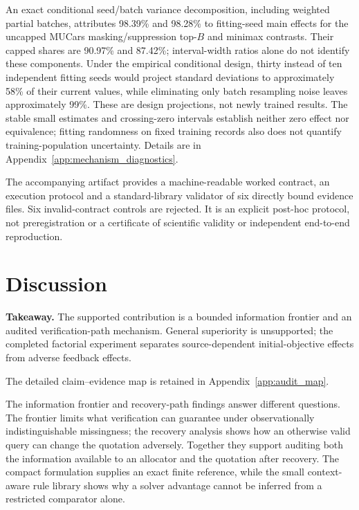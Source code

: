 \documentclass[11pt]{article}
\begin{document}
An exact conditional seed/batch variance decomposition, including weighted
partial batches, attributes 98.39\% and 98.28\% to fitting-seed main effects
for the uncapped MUCars masking/suppression top-$B$ and minimax contrasts.
Their capped shares are 90.97\% and 87.42\%; interval-width ratios alone do
not identify these components. Under the empirical conditional design,
thirty instead of ten independent fitting seeds would project standard
deviations to approximately 58\% of their current values, while eliminating
only batch resampling noise leaves approximately 99\%. These are design
projections, not newly trained results. The stable small estimates and
crossing-zero intervals establish neither zero effect nor equivalence;
fitting randomness on fixed training records also does not quantify
training-population uncertainty. Details are in
Appendix~\ref{app:mechanism_diagnostics}.


The accompanying  artifact provides a machine-readable
worked contract, an execution protocol and a standard-library validator of
six directly bound evidence files. Six invalid-contract controls are rejected.
It is an explicit post-hoc protocol, not preregistration or a certificate of
scientific validity or independent end-to-end reproduction.

\section{Discussion}\label{sec:discussion}
\noindent\textbf{Takeaway.} The supported contribution is a bounded information
frontier and an audited verification-path mechanism. General superiority is unsupported; the completed factorial experiment
separates source-dependent initial-objective effects from adverse feedback effects.

The detailed claim--evidence map is retained in Appendix~\ref{app:audit_map}.



The information frontier and recovery-path findings answer different questions.
The frontier limits what verification can guarantee under observationally
indistinguishable missingness; the recovery analysis shows how an otherwise
valid query can change the quotation adversely. Together they support auditing
both the information available to an allocator and the quotation after recovery.
The compact formulation supplies an exact finite reference, while the small
context-aware rule library shows why a solver advantage cannot be inferred
from a restricted comparator alone.
\end{document}

